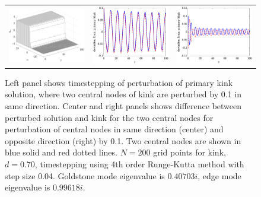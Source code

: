 \documentclass[12pt,reqno]{amsart}
\begin{document}
\begin{figure}[H]
	\begin{center}
	\begin{tabular}{ccc}
	\includegraphics[width=5cm]{kinkwaterfall1.eps} &
	\includegraphics[width=5cm]{kinkoscgoldstone.eps} &
	\includegraphics[width=5cm]{kinkoscedge.eps}
	\end{tabular}
	\end{center}
	\caption{Left panel shows timestepping of perturbation of primary kink solution, where two central nodes of kink are perturbed by 0.1 in same direction. Center and right panels shows difference between perturbed solution and kink for the two central nodes for perturbation of central nodes in same direction (center) and opposite direction (right) by 0.1. Two central nodes are shown in blue solid and red dotted lines. $N=200$ grid points for kink, $d = 0.70$, timestepping using 4th order Runge-Kutta method with step size 0.04. Goldstone mode eigenvalue is $0.40703i$, edge mode eigenvalue is $0.99618i$.
	} 
	\label{fig:kinktimestep}
\end{figure}
\end{document}
